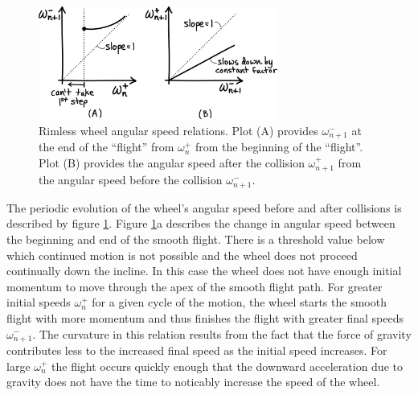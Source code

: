 \begin{figure}[h]		%
\begin{centering}
\includegraphics[width=0.7\textwidth]{Figures/RimlessPlots2}\par
\end{centering}
\caption[Plot: Rimless Wheel Angular Speed Relations]{Rimless wheel angular speed relations. Plot (A) provides $\omega_{n+1}^{-}$ at the end of the ``flight'' from $\omega_{n}^{+}$ from the beginning of the ``flight''. Plot (B) provides the angular speed after the collision $\omega_{n+1}^{+}$ from the angular speed before the collision $\omega_{n+1}^{-}$.}
\label{fig:RimlessPlots2}
\end{figure}
%

The periodic evolution of the wheel's angular speed before and after collisions is described by figure \ref{fig:RimlessPlots2}. Figure \ref{fig:RimlessPlots2}a describes the change in angular speed between the beginning and end of the smooth flight. There is a threshold value below which continued motion is not possible and the wheel does not proceed continually down the incline. In this case the wheel does not have enough initial momentum to move through the apex of the smooth flight path. For greater initial speeds $\omega_{n}^{+}$ for a given cycle of the motion, the wheel starts the smooth flight with more momentum and thus finishes the flight with greater final speeds $\omega_{n+1}^{-}$. The curvature in this relation results from the fact that the force of gravity contributes less to the increased final speed as the initial speed increases. For large $\omega_{n}^{+}$ the flight occurs quickly enough that the downward acceleration due to gravity does not have the time to noticably increase the speed of the wheel.

